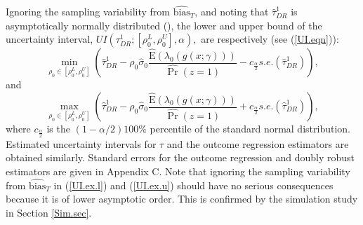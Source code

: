 \documentclass[11pt]{article}
\newcommand{\E}{{\mbox{E}}}
\newcommand{\bias}{\mbox{bias}}
\begin{document}
Ignoring the sampling variability from $\widehat{\bias}_T$, and noting that $\hat\tau_{DR}^1$ is asymptotically normally distributed (\citealp{Tsiatis:06}), the lower and upper bound of the uncertainty interval, $UI(\tau_{DR}^1; [\rho_0^L,\rho_0^U],\alpha),$ are respectively (see (\ref{UI.eqn})):
\begin{equation}
\min \limits_{\rho_0 \in [\rho_0^L,\rho_0^U]} \left( \hat \tau^1_{DR} -  \rho_0 \hat\sigma_{0}\frac{\hat\E(\lambda_0(g(x; \gamma)))}{\widehat{\Pr}(z=1)} -c_{\frac{\alpha}{2}}s.e.(\hat \tau^1_{DR}) \right),
\label{UI.ex.l}
\end{equation}
and
\begin{equation}
\max \limits_{\rho_0 \in [\rho_0^L,\rho_0^U]} \left( \hat \tau^1_{DR} -  \rho_0 \hat\sigma_{0} \frac{\hat\E(\lambda_0(g(x; \gamma)))}{\widehat{\Pr}(z=1)} +c_{\frac{\alpha}{2}}s.e.(\hat \tau^1_{DR}) \right),
\label{UI.ex.u}
\end{equation}
where $c_{\frac{\alpha}{2}}$ is the $(1-\alpha/2)100 \%$ percentile of the standard normal distribution. Estimated uncertainty intervals for $\tau$ and the outcome regression estimators are obtained similarly. Standard errors for the outcome regression and doubly robust estimators are given in Appendix C. Note that ignoring the sampling variability from $\widehat{\bias}_T$ in (\ref{UI.ex.l}) and (\ref{UI.ex.u}) should have no serious consequences because it is of lower asymptotic order. This is confirmed by the simulation study in Section \ref{Sim.sec}.
\end{document}
